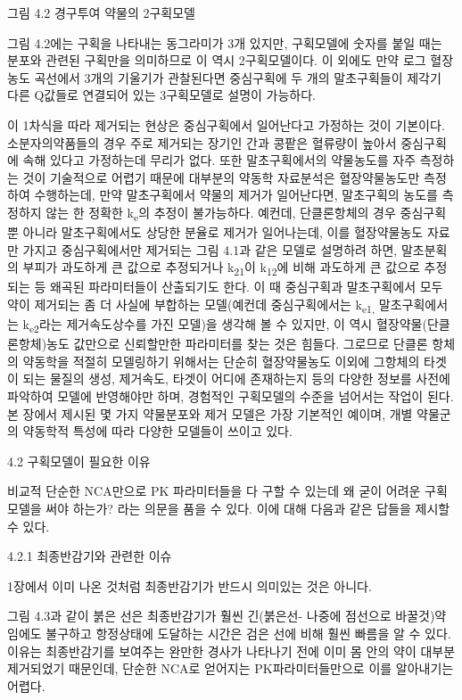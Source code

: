 \documentclass[
  11pt,
  krantz2, a4paper, twoside]{krantz}
\begin{document}
그림 4.2 경구투여 약물의 2구획모델

그림 4.2에는 구획을 나타내는 동그라미가 3개 있지만, 구획모델에 숫자를
붙일 때는 분포와 관련된 구획만을 의미하므로 이 역시 2구획모델이다. 이
외에도 만약 로그 혈장농도 곡선에서 3개의 기울기가 관찰된다면 중심구획에
두 개의 말초구획들이 제각기 다른 Q값들로 연결되어 있는 3구획모델로
설명이 가능하다.

이 1차식을 따라 제거되는 현상은 중심구획에서 일어난다고 가정하는 것이
기본이다. 소분자의약품들의 경우 주로 제거되는 장기인 간과 콩팥은
혈류량이 높아서 중심구획에 속해 있다고 가정하는데 무리가 없다. 또한
말초구획에서의 약물농도를 자주 측정하는 것이 기술적으로 어렵기 때문에
대부분의 약동학 자료분석은 혈장약물농도만 측정하여 수행하는데, 만약
말초구획에서 약물의 제거가 일어난다면, 말초구획의 농도를 측정하지 않는
한 정확한 k\textsubscript{e}의 추정이 불가능하다. 예컨데, 단클론항체의 경우 중심구획
뿐 아니라 말초구획에서도 상당한 분율로 제거가 일어나는데, 이를
혈장약물농도 자료만 가지고 중심구획에서만 제거되는 그림 4.1과 같은
모델로 설명하려 하면, 말초분획의 부피가 과도하게 큰 값으로 추정되거나
k\textsubscript{21}이 k\textsubscript{12}에 비해 과도하게 큰 값으로 추정되는 등 왜곡된 파라미터들이
산출되기도 한다. 이 때 중심구획과 말초구획에서 모두 약이 제거되는 좀 더
사실에 부합하는 모델(예컨데 중심구획에서는 k\textsubscript{e1,} 말초구획에서는
k\textsubscript{e2}라는 제거속도상수를 가진 모델)을 생각해 볼 수 있지만, 이 역시
혈장약물(단클론항체)농도 값만으로 신뢰할만한 파라미터를 찾는 것은
힘들다. 그로므로 단클론 항체의 약동학을 적절히 모델링하기 위해서는
단순히 혈장약물농도 이외에 그항체의 타겟이 되는 물질의 생성, 제거속도,
타겟이 어디에 존재하는지 등의 다양한 정보를 사전에 파악하여 모델에
반영해야만 하며, 경험적인 구획모델의 수준을 넘어서는 작업이 된다. 본
장에서 제시된 몇 가지 약물분포와 제거 모델은 가장 기본적인 예이며, 개별
약물군의 약동학적 특성에 따라 다양한 모델들이 쓰이고 있다.

4.2 구획모델이 필요한 이유

비교적 단순한 NCA만으로 PK 파라미터들을 다 구할 수 있는데 왜 굳이 어려운
구획모델을 써야 하는가? 라는 의문을 품을 수 있다. 이에 대해 다음과 같은
답들을 제시할 수 있다.

4.2.1 최종반감기와 관련한 이슈

1장에서 이미 나온 것처럼 최종반감기가 반드시 의미있는 것은 아니다.

그림 4.3과 같이 붉은 선은 최종반감기가 훨씬 긴(붉은선- 나중에 점선으로
바꿀것)약임에도 불구하고 항정상태에 도달하는 시간은 검은 선에 비해 훨씬
빠름을 알 수 있다. 이유는 최종반감기를 보여주는 완만한 경사가 나타나기
전에 이미 몸 안의 약이 대부분 제거되었기 때문인데, 단순한 NCA로 얻어지는
PK파라미터들만으로 이를 알아내기는 어렵다.
\end{document}
